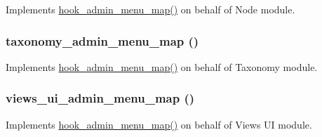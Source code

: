\label{admin__menu_8map_8inc_a645da462c9f34a48bdfc0d76c47c1d8d}
Implements \hyperlink{admin__menu_8api_8php_a4b3f2235db483f670a2e7327633868df}{hook\_\-admin\_\-menu\_\-map()} on behalf of Node module. \hypertarget{admin__menu_8map_8inc_a9cf1f3384b4db256d5c656285569e9fa}{
\subsubsection[{taxonomy\_\-admin\_\-menu\_\-map}]{\setlength{\rightskip}{0pt plus 5cm}taxonomy\_\-admin\_\-menu\_\-map ()}}
\label{admin__menu_8map_8inc_a9cf1f3384b4db256d5c656285569e9fa}
Implements \hyperlink{admin__menu_8api_8php_a4b3f2235db483f670a2e7327633868df}{hook\_\-admin\_\-menu\_\-map()} on behalf of Taxonomy module. \hypertarget{admin__menu_8map_8inc_a163fdee910cbe6b7d402a19850eb12c2}{
\subsubsection[{views\_\-ui\_\-admin\_\-menu\_\-map}]{\setlength{\rightskip}{0pt plus 5cm}views\_\-ui\_\-admin\_\-menu\_\-map ()}}
\label{admin__menu_8map_8inc_a163fdee910cbe6b7d402a19850eb12c2}
Implements \hyperlink{admin__menu_8api_8php_a4b3f2235db483f670a2e7327633868df}{hook\_\-admin\_\-menu\_\-map()} on behalf of Views UI module. 